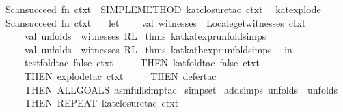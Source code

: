\begin{isabellebody}
Scan{}succeed\ {}fn\ ctxt\ {}{}\ SIMPLE{}METHOD\ {}kat{}closure{}tac\ ctxt\ {}{}{}\isanewline
{}\isanewline
\isanewline
{}\isamarkupfalse%
\ kat{}explode\ {}\ {}\isanewline
Scan{}succeed\ {}fn\ ctxt\ {}{}\isanewline
\ \ let\isanewline
\ \ \ \ val\ witnesses\ {}\ Locale{}get{}witnesses\ ctxt\isanewline
\ \ \ \ val\ unfolds{}\ {}\ witnesses\ RL\ %
\isaantiq
thms\ kat{}kat{}expr{}unfold{}simps{}%
\endisaantiq
\isanewline
\ \ \ \ val\ unfolds{}\ {}\ witnesses\ RL\ %
\isaantiq
thms\ kat{}kat{}bexpr{}unfold{}simps{}%
\endisaantiq
\isanewline
\ \ in\isanewline
\ \ \ \ test{}fold{}tac\ false\ ctxt\ {}\isanewline
\ \ \ \ THEN\ kat{}fold{}tac\ false\ ctxt\ {}\isanewline
\ \ \ \ THEN\ explode{}tac\ ctxt\ {}\isanewline
\ \ \ \ THEN\ defer{}tac\ {}\isanewline
\ \ \ \ THEN\ ALLGOALS\ {}asm{}full{}simp{}tac\ {}%
\isaantiq
simpset{}%
\endisaantiq
\ addsimps\ unfolds{}\ {}\ unfolds{}{}{}\isanewline
\ \ \ \ THEN\ REPEAT{}\ {}kat{}closure{}tac\ ctxt\ {}{}\isanewline

\end{isabellebody}
